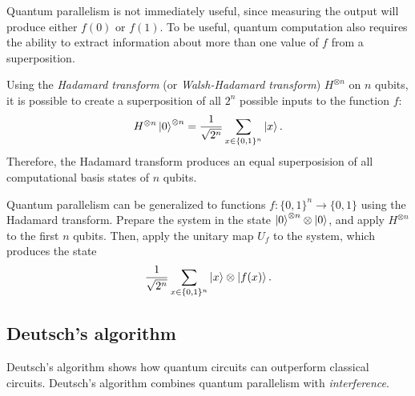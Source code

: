 Quantum parallelism is not immediately useful,
since measuring the output will produce either $f(0)$ or $f(1)$.
To be useful,
quantum computation also requires the ability to extract information about more than one value of $f$ from a superposition.

Using the \emph{Hadamard transform} (or \emph{Walsh-Hadamard transform}) $H^{\otimes n}$ on $n$ qubits,
 it is possible to create a superposition of all $2^n$ possible inputs to the function $f$:
 \[
   H^{\otimes n}\ket{0}^{\otimes n} = \frac{1}{\sqrt{2^n}} \sum_{x \in \{0, 1\}^n} \ket{x}.
 \]
Therefore, the Hadamard transform produces an equal superposision of all computational basis states of $n$ qubits.

Quantum parallelism can be generalized to functions $f\colon\{0, 1\}^n \to \{0, 1\}$ using the Hadamard transform.
Prepare the system in the state $\ket{0}^{\otimes n} \otimes \ket{0}$, and apply $H^{\otimes n}$ to the first $n$ qubits.
Then, apply the unitary map $U_f$ to the system, which produces the state
\[
    \frac{1}{\sqrt{2^n}} \sum_{x \in \{0, 1\}^n} \ket{x} \otimes \ket{f(x)}.
\]

\subsection{Deutsch's algorithm}
Deutsch's algorithm shows how quantum circuits can outperform classical circuits.
Deutsch's algorithm combines quantum parallelism with \emph{interference}.

